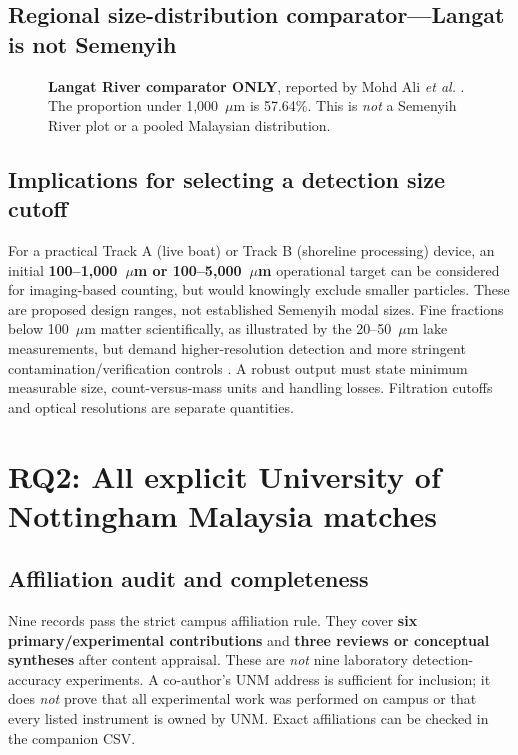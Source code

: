 \documentclass[10pt,a4paper]{article}
\begin{document}
\subsection{Regional size-distribution comparator---Langat is not Semenyih}
\begin{figure}[H]\centering
{}
\caption{\textbf{Langat River comparator ONLY}, reported by Mohd Ali \emph{et al.} \cite{Corpus04}. The proportion under 1,000~$\mu$m is 57.64\%. This is \emph{not} a Semenyih River plot or a pooled Malaysian distribution.}\label{fig:langat}
\end{figure}

\subsection{Implications for selecting a detection size cutoff}
For a practical Track A (live boat) or Track B (shoreline processing) device, an initial \textbf{100--1,000~$\mu$m or 100--5,000~$\mu$m} operational target can be considered for imaging-based counting, but would knowingly exclude smaller particles. These are proposed design ranges, not established Semenyih modal sizes. Fine fractions below 100~$\mu$m matter scientifically, as illustrated by the 20--50~$\mu$m lake measurements, but demand higher-resolution detection and more stringent contamination/verification controls \cite{Corpus03,Corpus24}. A robust output must state minimum measurable size, count-versus-mass units and handling losses. Filtration cutoffs and optical resolutions are separate quantities.

\section{RQ2: All explicit University of Nottingham Malaysia matches}
\subsection{Affiliation audit and completeness}
Nine records pass the strict campus affiliation rule. They cover \textbf{six primary/experimental contributions} and \textbf{three reviews or conceptual syntheses} after content appraisal. These are \emph{not} nine laboratory detection-accuracy experiments. A co-author's UNM address is sufficient for inclusion; it does \emph{not} prove that all experimental work was performed on campus or that every listed instrument is owned by UNM. Exact affiliations can be checked in the companion CSV.
\end{document}
